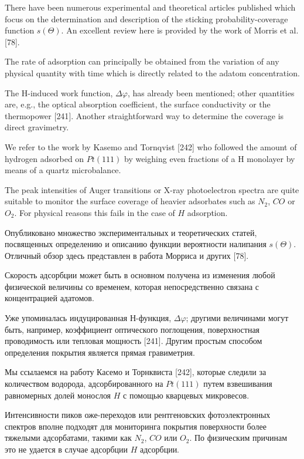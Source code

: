 \documentclass[11pt]{article}
\begin{document}
    There have been numerous experimental and theoretical articles published
which focus on the determination and description of the sticking
probability-coverage function \(s(\Theta)\). An excellent review here is
provided by the work of Morris et al. {[}78{]}.

The rate of adsorption can principally be obtained from the variation of
any physical quantity with time which is directly related to the adatom
concentration.

The H-induced work function, \(\Delta \varphi\), has already been
mentioned; other quantities are, e.g., the optical absorption
coefficient, the surface conductivity or the thermopower {[}241{]}.
Another straightforward way to determine the coverage is direct
gravimetry.

We refer to the work by Kasemo and Tornqvist {[}242{]} who followed the
amount of hydrogen adsorbed on \(Pt(111)\) by weighing even fractions of
a H monolayer by means of a quartz microbalance.

The peak intensities of Auger transitions or X-ray photoelectron spectra
are quite suitable to monitor the surface coverage of heavier adsorbates
such as \(N_2\), \(CO\) or \(O_2\). For physical reasons this fails in
the case of \(H\) adsorption.

    Опубликовано множество экспериментальных и теоретических статей,
посвященных определению и описанию функции вероятности налипания
\(s(\Theta)\). Отличный обзор здесь представлен в работа Морриса и
других {[}78{]}.

Скорость адсорбции может быть в основном получена из изменения любой
физической величины со временем, которая непосредственно связана с
концентрацией адатомов.

Уже упоминалась индуцированная Н-функция, \(\Delta \varphi\); другими
величинами могут быть, например, коэффициент оптического поглощения,
поверхностная проводимость или тепловая мощность {[}241{]}. Другим
простым способом определения покрытия является прямая гравиметрия.

Мы ссылаемся на работу Касемо и Торнквиста {[}242{]}, которые следили за
количеством водорода, адсорбированного на \(Pt(111)\) путем взвешивания
равномерных долей монослоя \(H\) с помощью кварцевых микровесов.

Интенсивности пиков оже-переходов или рентгеновских фотоэлектронных
спектров вполне подходят для мониторинга покрытия поверхности более
тяжелыми адсорбатами, такими как \(N_2\), \(CO\) или \(O_2\). По
физическим причинам это не удается в случае адсорбции \(H\) адсорбции.
\end{document}
